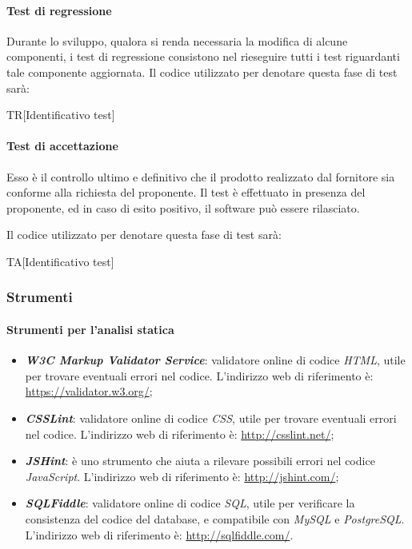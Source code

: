 		\paragraph{Test di regressione}
		Durante lo sviluppo, qualora si renda necessaria la modifica di alcune componenti, i test di regressione consistono nel rieseguire tutti i test riguardanti tale componente aggiornata. Il codice utilizzato per denotare questa fase di test sarà:
		
		\begin{center}
			TR[Identificativo test]
		\end{center}
	
		\paragraph{Test di accettazione}
		Esso è il controllo ultimo e definitivo che il prodotto realizzato dal fornitore sia conforme alla richiesta del proponente. Il test è effettuato in presenza del proponente, ed in caso di esito positivo, il software può essere rilasciato.
		
		Il codice utilizzato per denotare questa fase di test sarà:
		
		\begin{center}
			TA[Identificativo test]
		\end{center}
	
		\subsubsection{Strumenti}
		
		\paragraph{Strumenti per l'analisi statica}
		
		\begin{itemize}
			\item \textbf{\textit{W3C Markup Validator Service}}: validatore online di codice \textit{HTML}, utile per trovare eventuali errori nel codice. L'indirizzo web di riferimento è: \url{https://validator.w3.org/};
			\item \textbf{\textit{CSSLint}}: validatore online di codice \textit{CSS}, utile per trovare eventuali errori nel codice. L'indirizzo web di riferimento è: \url{http://csslint.net/};
			\item \textit{\textbf{JSHint}}: è uno strumento che aiuta a rilevare possibili
			errori nel codice \textit{JavaScript}. L'indirizzo web di riferimento è: \url{http://jshint.com/};
			\item \textbf{\textit{SQLFiddle}}: validatore online di codice \textit{SQL}, utile per verificare la consistenza del codice del database, e compatibile con \textit{MySQL} e \textit{PostgreSQL}. L'indirizzo web di riferimento è: \url{http://sqlfiddle.com/}.
		\end{itemize}
	
